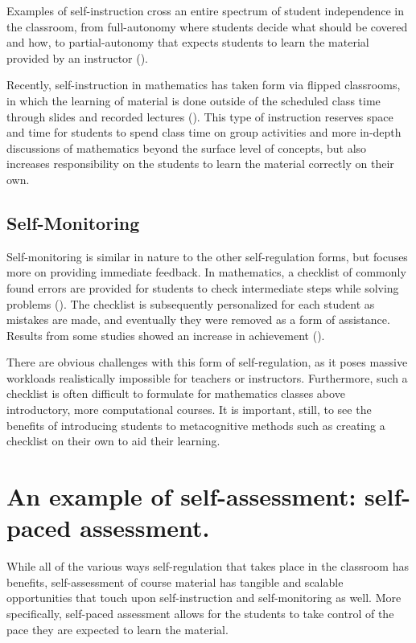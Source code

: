 Examples of self-instruction cross an entire spectrum of student independence in the classroom, from full-autonomy where students decide what should be covered and how, to partial-autonomy that expects students to learn the material provided by an instructor (\cite{burris_developmental_1972}).

Recently, self-instruction in mathematics has taken form via flipped classrooms, in which the learning of material is done outside of the scheduled class time through slides and recorded lectures (\cite{lage_inverting_2000}). This type of instruction reserves space and time for students to spend class time on group activities and more in-depth discussions of mathematics beyond the surface level of concepts, but also increases responsibility on the students to learn the material correctly on their own.

\subsection{Self-Monitoring}
Self-monitoring is similar in nature to the other self-regulation forms, but focuses more on providing immediate feedback. In mathematics, a checklist of commonly found errors are provided for students to check intermediate steps while solving problems (\cite{dunlap_custom}). The checklist is subsequently personalized for each student as mistakes are made, and eventually they were removed as a form of assistance. Results from some studies showed an increase in achievement (\cite{dunlap_ld}).

There are obvious challenges with this form of self-regulation, as it  poses massive workloads realistically impossible for teachers or instructors. Furthermore, such a checklist is often difficult to formulate for mathematics classes above introductory, more computational courses. It is important, still, to see the benefits of introducing students to metacognitive methods such as creating a checklist on their own to aid their learning.

\section{An example of self-assessment: self-paced assessment.}
While all of the various ways self-regulation that takes place in the classroom has benefits, self-assessment of course material has tangible and scalable opportunities that touch upon self-instruction and self-monitoring as well. More specifically, self-paced assessment allows for the students to take control of the pace they are expected to learn the material.

